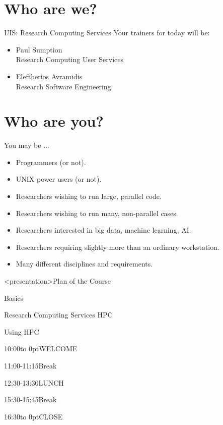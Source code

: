 \documentclass[handout]{beamer} %
\begin{document}
\section{Who are we?}
\begin{frame}{UIS: Research Computing Services}
Your trainers for today will be:\\
\begin{itemize}
\item{\alert{Paul Sumption}\\{}\qquad\qquad Research Computing User Services}
\item{\alert{Eleftherios Avramidis}\\{}\qquad\qquad Research Software Engineering}
\end{itemize}
\end{frame}

\section{Who are you?}
\begin{frame}{You may be $\ldots$}
  \begin{itemize}
  \item{Programmers (or not).}\pause
  \item{UNIX power users (or not).}\pause
  \item{Researchers wishing to run large, parallel code.}\pause
  \item{Researchers wishing to run many, non-parallel cases.}\pause
  \item{Researchers interested in big data, machine learning, AI.}\pause
  \item{Researchers requiring slightly more than an ordinary workstation.}\pause
  \item{\alert{Many different disciplines and requirements.}}
\end{itemize}
\end{frame}


\begin{frame}<presentation>{Plan of the Course}
\begin{description}
\item[Part 1:]{Basics}
\item[Part 2:]{Research Computing Services HPC}
\item[Part 3:]{Using HPC}
\medskip
\item<2>{\alert{10:00}\hbox to 0pt{\quad WELCOME\hss}}
\item<2>{\alert{11:00-11:15}\quad Break}
\item<2>{\alert{12:30-13:30}\quad LUNCH}
\item<2>{\alert{15:30-15:45}\quad Break}
\item<2>{\alert{16:30}\hbox to 0pt{\quad CLOSE\hss}}
\end{description}
\end{frame}


\end{document}
